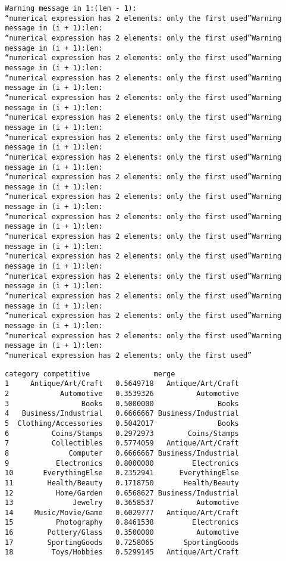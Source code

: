 \documentclass[11pt]{article}
\begin{document}
    \begin{Verbatim}[commandchars=\\\{\}]
Warning message in 1:(len - 1):
“numerical expression has 2 elements: only the first used”Warning message in (i + 1):len:
“numerical expression has 2 elements: only the first used”Warning message in (i + 1):len:
“numerical expression has 2 elements: only the first used”Warning message in (i + 1):len:
“numerical expression has 2 elements: only the first used”Warning message in (i + 1):len:
“numerical expression has 2 elements: only the first used”Warning message in (i + 1):len:
“numerical expression has 2 elements: only the first used”Warning message in (i + 1):len:
“numerical expression has 2 elements: only the first used”Warning message in (i + 1):len:
“numerical expression has 2 elements: only the first used”Warning message in (i + 1):len:
“numerical expression has 2 elements: only the first used”Warning message in (i + 1):len:
“numerical expression has 2 elements: only the first used”Warning message in (i + 1):len:
“numerical expression has 2 elements: only the first used”Warning message in (i + 1):len:
“numerical expression has 2 elements: only the first used”Warning message in (i + 1):len:
“numerical expression has 2 elements: only the first used”Warning message in (i + 1):len:
“numerical expression has 2 elements: only the first used”Warning message in (i + 1):len:
“numerical expression has 2 elements: only the first used”Warning message in (i + 1):len:
“numerical expression has 2 elements: only the first used”Warning message in (i + 1):len:
“numerical expression has 2 elements: only the first used”Warning message in (i + 1):len:
“numerical expression has 2 elements: only the first used”
    \end{Verbatim}

    \begin{Verbatim}[commandchars=\\\{\}]
               category competitive               merge
1     Antique/Art/Craft   0.5649718   Antique/Art/Craft
2            Automotive   0.3539326          Automotive
3                 Books   0.5000000               Books
4   Business/Industrial   0.6666667 Business/Industrial
5  Clothing/Accessories   0.5042017               Books
6          Coins/Stamps   0.2972973        Coins/Stamps
7          Collectibles   0.5774059   Antique/Art/Craft
8              Computer   0.6666667 Business/Industrial
9           Electronics   0.8000000         Electronics
10       EverythingElse   0.2352941      EverythingElse
11        Health/Beauty   0.1718750       Health/Beauty
12          Home/Garden   0.6568627 Business/Industrial
13              Jewelry   0.3658537          Automotive
14     Music/Movie/Game   0.6029777   Antique/Art/Craft
15          Photography   0.8461538         Electronics
16        Pottery/Glass   0.3500000          Automotive
17        SportingGoods   0.7258065       SportingGoods
18         Toys/Hobbies   0.5299145   Antique/Art/Craft

    \end{Verbatim}
\end{document}
